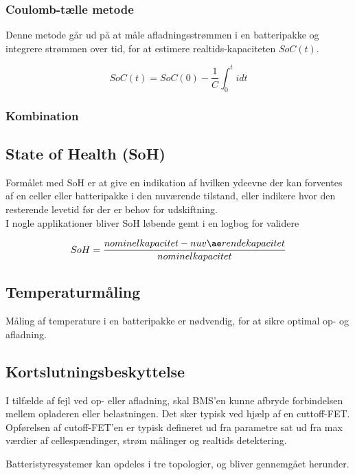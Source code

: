 \subsubsection{Coulomb-tælle metode}
Denne metode går ud på at måle afladningsstrømmen i en batteripakke og integrere strømmen over tid, for at estimere realtids-kapaciteten $SoC(t)$. 


\begin {equation} 
SoC(t) = SoC(0) - \frac{1}{C} \int_{0}^{t} idt  \label{eq:coulomb-count}
\end {equation}


\subsubsection{Kombination}


\subsection{State of Health (SoH)}
Formålet med SoH er at give en indikation af hvilken ydeevne der kan forventes af en celler eller batteripakke i den nuværende tilstand, eller indikere hvor den resterende levetid før der er behov for udskiftning.
\\
I nogle applikationer bliver SoH løbende gemt i en logbog for validere

\begin {equation} 
SoH = \frac{nominel \space kapacitet - nuværende  kapacitet}{nominel kapacitet} \label{eq:soh}
\end {equation}


\subsection{Temperaturmåling}
Måling af temperature i en batteripakke er nødvendig, for at sikre optimal op- og afladning. 

\subsection{Kortslutningsbeskyttelse}
I tilfælde af fejl ved op- eller afladning, skal BMS'en kunne afbryde forbindelsen mellem opladeren eller belastningen. Det sker typisk ved hjælp af en cuttoff-FET. Opførelsen af cutoff-FET'en er typisk defineret ud fra parametre sat ud fra max værdier af cellespændinger, strøm målinger og realtids detektering. 

Batteristyresystemer kan opdeles i tre topologier, og bliver gennemgået herunder.